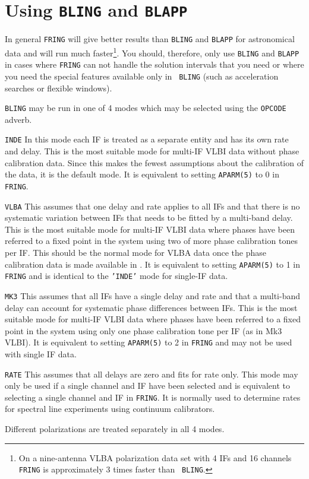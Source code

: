 \section{Using {\tt BLING} and {\tt BLAPP}}

In general {\tt FRING} will give better results than {\tt BLING} and
{\tt BLAPP} for astronomical data and will run much faster\footnote{On
a nine-antenna VLBA polarization data set with 4 IFs and 16
channels {\tt FRING} is approximately 3 times faster than {\tt
BLING}.}.  You should, therefore, only use {\tt BLING} and {\tt BLAPP}
in cases where {\tt FRING} can not handle the solution intervals that
you need or where you need the special features available only in {\tt
BLING} (such as acceleration searches or flexible windows).

{\tt BLING} may be run in one of 4 modes which may be selected using
the {\tt OPCODE} adverb.
\begin{description}
\item{\tt INDE}
In this mode each IF is treated as a separate entity and has its own
rate and delay.  This is the most suitable mode for multi-IF VLBI data
without phase calibration data.  Since this makes the fewest
assumptions about the calibration of the data, it is the default
mode.  It is equivalent to setting {\tt APARM(5)} to 0 in {\tt FRING}.

\item{\tt VLBA}
This assumes that one delay and rate applies to all IFs and that there
is no systematic variation between IFs that needs to be fitted by a
multi-band delay.  This is the most suitable mode for multi-IF VLBI
data where phases have been referred to a fixed point in the system
using two of more phase calibration tones per IF.  This should be the
normal mode for VLBA data once the phase calibration data is made
available in \AIPS.  It is equivalent to setting {\tt APARM(5)} to 1
in {\tt FRING} and is identical to the {\tt 'INDE'} mode for single-IF
data.

\item{\tt MK3}
This assumes that all IFs have a single delay and rate and that a
multi-band delay can account for systematic phase differences between
IFs.  This is the most suitable mode for multi-IF VLBI data where
phases have been referred to  a fixed point in the system using only
one phase calibration tone per IF (as in Mk3 VLBI).  It is equivalent
to setting {\tt APARM(5)} to 2 in {\tt FRING} and may not be used with
single IF data.

\item{\tt RATE}
This assumes that all delays are zero and fits for rate only.  This
mode may only be used if a single channel and IF have been selected
and is equivalent to selecting a single channel and IF in {\tt FRING}.
It is normally used to determine rates for spectral line experiments
using continuum calibrators.
\end{description}
Different polarizations are treated separately in all 4 modes.

